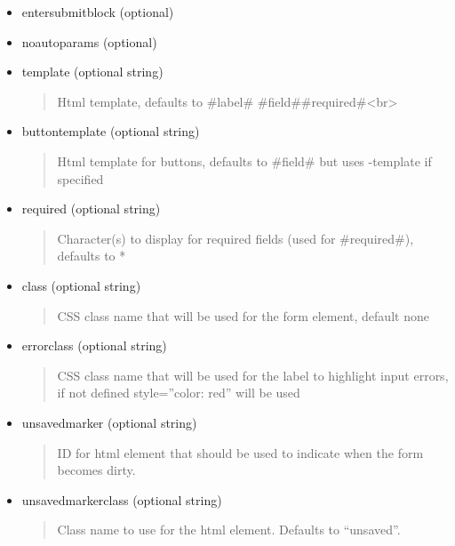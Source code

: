 \documentclass[letterpaper,10pt,english]{sphinxmanual}
\begin{document}
\begin{fulllineitems}
\begin{fulllineitems}
\begin{description}
\begin{itemize}
\item {} 
entersubmitblock (optional)

\item {} 
noautoparams (optional)

\item {} 
template (optional string)
\begin{quote}

Html template, defaults to \#label\# \#field\#\#required\#\textless{}br\textgreater{}
\end{quote}

\item {} 
buttontemplate (optional string)
\begin{quote}

Html template for buttons, defaults to \#field\# but uses -template if specified
\end{quote}

\item {} 
required (optional string)
\begin{quote}

Character(s) to display for required fields (used for \#required\#), defaults to *
\end{quote}

\item {} 
class (optional string)
\begin{quote}

CSS class name that will be used for the form element, default none
\end{quote}

\item {} 
errorclass (optional string)
\begin{quote}

CSS class name that will be used for the label to highlight input errors, if not defined style=''color: red'' will be used
\end{quote}

\item {} 
unsavedmarker (optional string)
\begin{quote}

ID for html element that should be used to indicate when the form becomes dirty.
\end{quote}

\item {} 
unsavedmarkerclass (optional string)
\begin{quote}

Class name to use for the html element. Defaults to ``unsaved''.
\end{quote}


\end{itemize}
\end{description}
\end{fulllineitems}
\end{fulllineitems}
\end{document}
